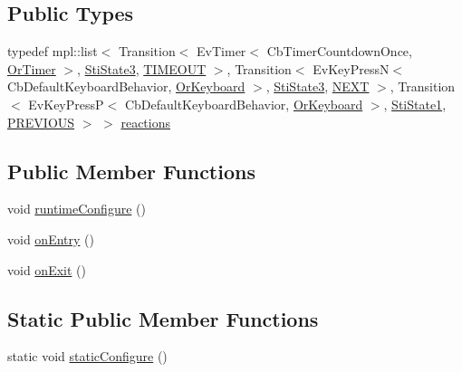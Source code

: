 \subsection*{Public Types}
\begin{DoxyCompactItemize}
\item 
typedef mpl\+::list$<$ Transition$<$ Ev\+Timer$<$ Cb\+Timer\+Countdown\+Once, \hyperlink{classsm__ferrari_1_1OrTimer}{Or\+Timer} $>$, \hyperlink{structsm__ferrari_1_1inner__states_1_1StiState3}{Sti\+State3}, \hyperlink{structsm__ferrari_1_1inner__states_1_1StiState2_1_1TIMEOUT}{T\+I\+M\+E\+O\+UT} $>$, Transition$<$ Ev\+Key\+PressN$<$ Cb\+Default\+Keyboard\+Behavior, \hyperlink{classsm__ferrari_1_1OrKeyboard}{Or\+Keyboard} $>$, \hyperlink{structsm__ferrari_1_1inner__states_1_1StiState3}{Sti\+State3}, \hyperlink{structsm__ferrari_1_1inner__states_1_1StiState2_1_1NEXT}{N\+E\+XT} $>$, Transition$<$ Ev\+Key\+PressP$<$ Cb\+Default\+Keyboard\+Behavior, \hyperlink{classsm__ferrari_1_1OrKeyboard}{Or\+Keyboard} $>$, \hyperlink{structsm__ferrari_1_1inner__states_1_1StiState1}{Sti\+State1}, \hyperlink{structsm__ferrari_1_1inner__states_1_1StiState2_1_1PREVIOUS}{P\+R\+E\+V\+I\+O\+US} $>$ $>$ \hyperlink{structsm__ferrari_1_1inner__states_1_1StiState2_a2b4c8b8d812b7b028abf9fd61357ab22}{reactions}
\end{DoxyCompactItemize}
\subsection*{Public Member Functions}
\begin{DoxyCompactItemize}
\item 
void \hyperlink{structsm__ferrari_1_1inner__states_1_1StiState2_a232db965739ca651217451b286940d49}{runtime\+Configure} ()
\item 
void \hyperlink{structsm__ferrari_1_1inner__states_1_1StiState2_a6369802f0a94bfd140bde808ed859f73}{on\+Entry} ()
\item 
void \hyperlink{structsm__ferrari_1_1inner__states_1_1StiState2_ae8a355b69ad90e3c16b7254d9cb4dd04}{on\+Exit} ()
\end{DoxyCompactItemize}
\subsection*{Static Public Member Functions}
\begin{DoxyCompactItemize}
\item 
static void \hyperlink{structsm__ferrari_1_1inner__states_1_1StiState2_abcd572142d795998100e52204cf939a9}{static\+Configure} ()
\end{DoxyCompactItemize}
